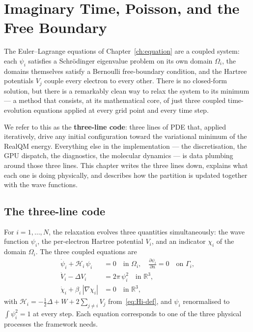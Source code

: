 \chapter{Imaginary Time, Poisson, and the Free Boundary}\label{ch:relaxation}

The Euler--Lagrange equations of Chapter~\ref{ch:equation} are a coupled system: each $\psi_i$ satisfies a Schr\"odinger eigenvalue problem on its own domain $\Omega_i$, the domains themselves satisfy a Bernoulli free-boundary condition, and the Hartree potentials $V_j$ couple every electron to every other. There is no closed-form solution, but there is a remarkably clean way to relax the system to its minimum --- a method that consists, at its mathematical core, of just three coupled time-evolution equations applied at every grid point and every time step.

We refer to this as the \textbf{three-line code}: three lines of PDE that, applied iteratively, drive any initial configuration toward the variational minimum of the RealQM energy. Everything else in the implementation --- the discretisation, the GPU dispatch, the diagnostics, the molecular dynamics --- is data plumbing around those three lines. This chapter writes the three lines down, explains what each one is doing physically, and describes how the partition is updated together with the wave functions.

\section{The three-line code}\label{sec:three-line}

For $i = 1, \ldots, N$, the relaxation evolves three quantities simultaneously: the wave function $\psi_i$, the per-electron Hartree potential $V_i$, and an indicator $\chi_i$ of the domain $\Omega_i$. The three coupled equations are
\begin{align}
\dot{\psi}_i + \mathcal{H}_i\, \psi_i &= 0 \quad\text{in } \Omega_i, \quad \frac{\partial \psi_i}{\partial n} = 0 \quad\text{on } \Gamma_i, \label{eq:3line-psi} \\
\dot{V}_i - \Delta V_i &= 2\pi\, \psi_i^2 \quad\text{in } \mathbb{R}^3, \label{eq:3line-V} \\
\dot{\chi}_i + \beta_i\, |\nabla \chi_i| &= 0 \quad\text{in } \mathbb{R}^3, \label{eq:3line-chi}
\end{align}
with $\mathcal{H}_i = -\tfrac{1}{2}\Delta + W + 2\sum_{j \ne i} V_j$ from~\eqref{eq:Hi-def}, and $\psi_i$ renormalised to $\int \psi_i^2 = 1$ at every step. Each equation corresponds to one of the three physical processes the framework needs.

